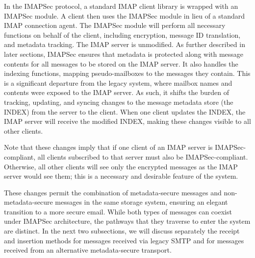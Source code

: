 \documentclass[pageno]{jpaper}
\newcommand{\project}{IMAPSec }
\newcommand{\projectnospace}{IMAPSec}
\begin{document}
In the \project protocol, a standard IMAP client library is wrapped with an \project module. A client then uses the \project module in lieu of a standard IMAP connection agent. The \project module will perform all necessary functions on behalf of the client, including encryption, message ID translation, and metadata tracking. The IMAP server is unmodified.
As further described in later sections, \project ensures that metadata is protected along with message contents for all messages to be stored on the IMAP server. It also handles the indexing functions, mapping pseudo-mailboxes to the messages they contain. This is a significant departure from the legacy system, where mailbox names and contents were exposed to the IMAP server. As such, it shifts the burden of tracking, updating, and syncing changes to the message metadata store (the INDEX) from the server to the client. When one client updates the INDEX, the IMAP server will receive the modified INDEX, making these changes visible to all other clients.


Note that these changes imply that if one client of an IMAP server is \projectnospace-compliant, all clients subscribed to that server must also be \projectnospace-compliant. Otherwise, all other clients will see only the encrypted messages as the IMAP server would see them; this is a necessary and desirable feature of the system.

These changes permit the combination of metadata-secure messages and non-metadata-secure messages in the same storage system, ensuring an elegant transition to a more secure email. While both types of messages can coexist under \project architecture, the pathways that they traverse to enter the system are distinct. In the next two subsections, we will discuss separately the receipt and insertion methods for messages received via legacy SMTP and for messages received from an alternative metadata-secure transport.
\end{document}
